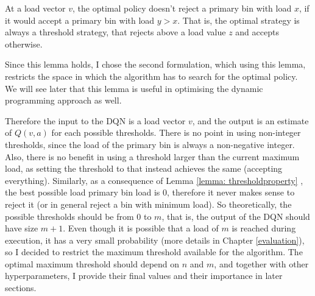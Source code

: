 \begin{lemma} \label{lemma: thresholdproperty}
At a load vector $v$, the optimal policy doesn't reject a primary bin with load $x$, if it would accept a primary bin with load $y>x$. That is, the optimal strategy is always a threshold strategy, that rejects above a load value $z$ and accepts otherwise.
\end{lemma}



Since this lemma holds, I chose the second formulation, which using this lemma, restricts the space in which the algorithm has to search for the optimal policy. We will see later that this lemma is useful in optimising the dynamic programming approach as well.


Therefore the input to the DQN is a load vector $v$, and the output is an estimate of $Q(v, a)$ for each possible thresholds. There is no point in using non-integer thresholds, since the load of the primary bin is always a non-negative integer. Also, there is no benefit in using a threshold larger than the current maximum load, as setting the threshold to that instead achieves the same (accepting everything). Similarly, as a consequence of Lemma \ref{lemma: thresholdproperty} , the best possible load primary bin load is $0$, therefore it never makes sense to reject it (or in general reject a bin with minimum load). So theoretically, the possible thresholds should be from $0$ to $m$, that is, the output of the DQN should have size $m+1$. Even though it is possible that a load of $m$ is reached during execution, it has a very small probability (more details in Chapter \ref{evaluation}), so I decided to restrict the maximum threshold available for the algorithm. The optimal maximum threshold should depend on $n$ and $m$, and together with other hyperparameters, I provide their final values and their importance in later sections. 


